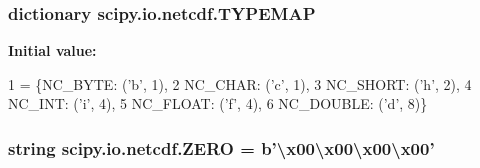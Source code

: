 \subsubsection[{T\+Y\+P\+E\+M\+A\+P}]{\setlength{\rightskip}{0pt plus 5cm}dictionary scipy.\+io.\+netcdf.\+T\+Y\+P\+E\+M\+A\+P}\label{namespacescipy_1_1io_1_1netcdf_a727ae029662cc9c04ad0fb7e01ac5947}
{\bfseries Initial value\+:}
\begin{DoxyCode}
1 = \{NC\_BYTE: (\textcolor{stringliteral}{'b'}, 1),
2             NC\_CHAR: (\textcolor{stringliteral}{'c'}, 1),
3             NC\_SHORT: (\textcolor{stringliteral}{'h'}, 2),
4             NC\_INT: (\textcolor{stringliteral}{'i'}, 4),
5             NC\_FLOAT: (\textcolor{stringliteral}{'f'}, 4),
6             NC\_DOUBLE: (\textcolor{stringliteral}{'d'}, 8)\}
\end{DoxyCode}
\hypertarget{namespacescipy_1_1io_1_1netcdf_a7ed9eacba238a78d0b9f134e97e7fd2f}{}
\subsubsection[{Z\+E\+R\+O}]{\setlength{\rightskip}{0pt plus 5cm}string scipy.\+io.\+netcdf.\+Z\+E\+R\+O = {\bf b}'\textbackslash{}x00\textbackslash{}x00\textbackslash{}x00\textbackslash{}x00'}\label{namespacescipy_1_1io_1_1netcdf_a7ed9eacba238a78d0b9f134e97e7fd2f}
